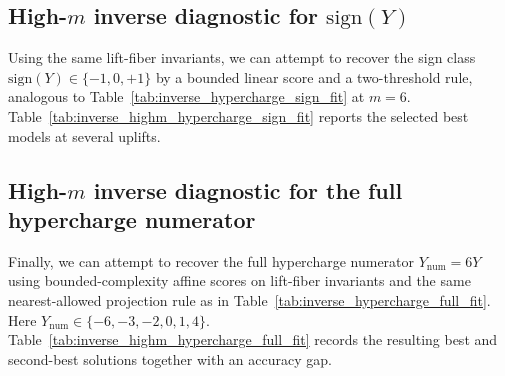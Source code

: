 \subsection{High-\texorpdfstring{$m$}{m} inverse diagnostic for \texorpdfstring{$\mathrm{sign}(Y)$}{sign(Y)}}

Using the same lift-fiber invariants, we can attempt to recover the sign class $\mathrm{sign}(Y)\in\{-1,0,+1\}$ by a bounded linear score and a two-threshold rule, analogous to Table~\ref{tab:inverse_hypercharge_sign_fit} at $m=6$.
Table~\ref{tab:inverse_highm_hypercharge_sign_fit} reports the selected best models at several uplifts.

\begin{table}[H]
\centering
\scriptsize
\setlength{\tabcolsep}{6pt}
\renewcommand{\arraystretch}{1.15}
%
\caption{High-$m$ inverse diagnostic for $\mathrm{sign}(Y)$ from lift-fiber invariants inside $\mathrm{Ext}_m(u)$ for cyclic base types $u\in X_6^{\mathrm{cyc}}$. Rows are generated by \texttt{scripts/exp\_inverse\_highm\_hypercharge\_sign\_fit.py}.}
\label{tab:inverse_highm_hypercharge_sign_fit}
\end{table}

\subsection{High-\texorpdfstring{$m$}{m} inverse diagnostic for the full hypercharge numerator}

Finally, we can attempt to recover the full hypercharge numerator $Y_{\mathrm{num}}=6Y$ using bounded-complexity affine scores on lift-fiber invariants and the same nearest-allowed projection rule as in Table~\ref{tab:inverse_hypercharge_full_fit}.
Here $Y_{\mathrm{num}}\in\{-6,-3,-2,0,1,4\}$.
Table~\ref{tab:inverse_highm_hypercharge_full_fit} records the resulting best and second-best solutions together with an accuracy gap.

\begin{table}[H]
\centering
\scriptsize
\setlength{\tabcolsep}{6pt}
\renewcommand{\arraystretch}{1.15}
%
\caption{High-$m$ inverse diagnostic for the full hypercharge numerator $Y_{\mathrm{num}}=6Y$ from lift-fiber invariants inside $\mathrm{Ext}_m(u)$ for cyclic base types $u\in X_6^{\mathrm{cyc}}$. Rows are generated by \texttt{scripts/exp\_inverse\_highm\_hypercharge\_full\_fit.py}.}
\label{tab:inverse_highm_hypercharge_full_fit}
\end{table}


